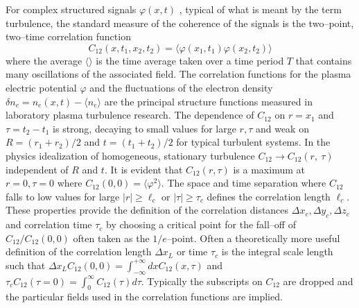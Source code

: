 \documentclass[a4paper,openany,12pt]{book}
\begin{document}
For complex structured signals $\varphi(x, t)$ , typical of what is meant by the term turbulence, the standard measure of the coherence of the signals is the two--point, two--time correlation function
\begin{equation}
C_{12}(x, t_1, x_2, t_2)=\langle\varphi(x_1, t_1)\varphi(x_2, t_2)\rangle\label{E9.1}
\end{equation}
where the average $\langle\rangle$ is the time average taken over a time period $T$ that contains many oscillations of the associated field. The correlation functions for the plasma electric potential $\varphi$ and the fluctuations of the electron density $\delta n_e=n_e(x, t)-\langle n_e\rangle$ are the principal structure functions measured in laboratory plasma turbulence research. The dependence of $C_{12}$ on $r=x_1$ and 
$\tau=t_2-t_1$ is strong, decaying to small values for large $r, \tau$ and weak on $R=(r_1+r_2)/2$ and $t=(t_1+t_2)/2$ for typical turbulent systems. In the physics idealization of homogeneous, stationary turbulence $C_{12}\to C_{12}(r,\ \tau)$ independent of $R$ and $t$. It is evident that $C_{12}(r, \tau)$ is a maximum at $r=0, \tau=0$ where $ C_{12}(0,0)=\langle\varphi^2\rangle$. The space and time separation where $C_{12}$ falls to low values for large $|r|\ge\ell_c$ or $|\tau|\ge\tau_c$ defines the correlation length $\ell_c$. These properties provide the definition of the correlation distances $\Delta x_c, \Delta y_c, \Delta z_c$ and correlation time $\tau_c$ by choosing a critical point for the fall--off of $C_{12}/C_{12}(0,0)$ often taken as the $1/e$--point. Often a theoretically more useful definition of the correlation length $\Delta x_L$ or time $\tau_c$ is the integral scale length such that $\Delta x_L C_{12}(0,0) = 
\int_{-\infty}^{+\infty} dxC_{12}(x, \tau)$ and $\tau_c C_{12}(\tau=0)=\int_0^\infty C_{12}(\tau)d\tau$. Typically the subscripts on $C_{12}$ are dropped and the particular fields used in the correlation functions are implied.
\end{document}

